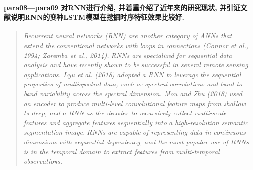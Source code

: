 \paragraph*{para08---para09
    \textcolor[RGB]{17, 205, 29}{对RNN进行介绍, 并着重介绍了近年来的研究现状, 并引证文献说明RNN的变种LSTM模型在挖掘时序特征效果比较好.}}
\begin{quotation}
    \itshape
    Recurrent neural networks (RNN) are another category of ANNs that extend the conventional networks with loops in connections (Connor et al., 1994; Zaremba et al., 2014). RNNs are specialized for sequential data analysis and have recently shown to be successful in several remote sensing applications. Lyu et al. (2018) adopted a RNN to leverage the sequential properties of multispectral data, such as spectral correlations and band-to-band variability across the spectral dimension. Mou and Zhu (2018) used an encoder to produce multi-level convolutional feature maps from shallow to deep, and a RNN as the decoder to recursively collect multi-scale features and aggregate features sequentially into a high-resolution semantic segmentation image. RNNs are capable of representing data in continuous dimensions with sequential dependency, and the most popular use of RNNs is in the temporal domain to extract features from multi-temporal observations.


\end{quotation}
